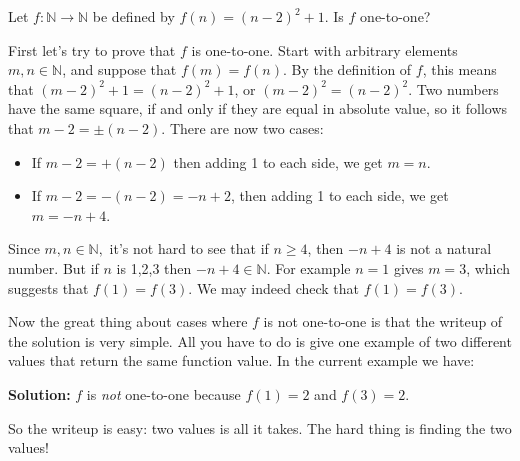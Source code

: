 \begin{example}{}
Let $f\colon \mathbb{N} \to \mathbb{N}$ be defined by $f(n)=(n-2)^2 + 1$.  Is $f$ one-to-one?
\medskip

First let's try to prove that $f$ is one-to-one.   
Start with arbitrary elements $m, n \in \mathbb{N}$, and suppose that $f(m)=f(n)$.  By the definition of $f$, this means that $(m-2)^2 + 1=(n-2)^2 + 1$, or $(m-2)^2 =(n-2)^2 $.  Two numbers have the same square, if and only if they are equal in absolute value, so it follows that $m-2 = \pm (n-2)$.  There are now two cases:
\begin{itemize}
\item
If $m-2=+(n-2)$ then adding 1 to each side, we get $m=n$.  
\item
If $m-2 = -(n-2) = -n+2$, then adding 1 to each side, we get $m=-n+4$.  
\end{itemize}
Since $m,n \in \mathbb{N},$ it's not hard to see that if $n \ge 4$, then $-n+4$ is not a natural number.  But if $n$ is 1,2,3 then $-n+4 \in \mathbb{N}$. For example $n=1$ gives $m = 3$, which suggests that $f(1) = f(3)$. We may indeed check that  $f(1) = f(3)$. 

Now the great thing about cases where $f$ is not one-to-one is that  the writeup of the solution is very simple. All you have to do is give one example of two different values that return the same function value. In the current example we have: 
\medskip

{\bf Solution:} $f$ is \emph{not} one-to-one because $f(1) = 2$ and $f(3) = 2$. 
\medskip

\noindent  
So the writeup is easy: two values is all it takes. The hard thing is finding the two values!
\end{example}

